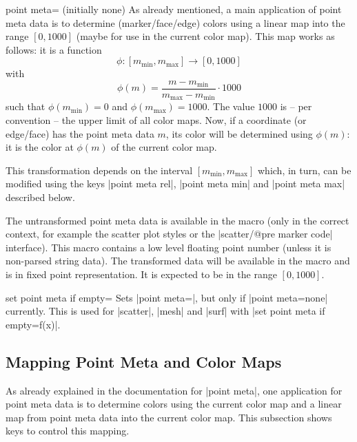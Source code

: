 \begin{pgfplotskey}{point meta= (initially none)%
}
    As already mentioned, a main application of point meta data is to determine
    (marker/face/edge) colors using a linear map into the range $[0,1000]$
    (maybe for use in the current color map). This map works as follows: it is
    a function
        \[ \phi\colon [m_{\min},m_{\max}] \to [0,1000] \]
    with
        \[ \phi(m) = \frac{m - m_{\min}}{m_{\max} - m_{\min}} \cdot 1000 \]
    such that $\phi(m_{\min}) = 0$ and $\phi(m_{\max})=1000$. The value $1000$
    is -- per convention -- the upper limit of all color maps. Now, if a
    coordinate (or edge/face) has the point meta data $m$, its color will be
    determined using $\phi(m)$: it is the color at $\phi(m)$\textperthousand{}
    of the current color map.

    This transformation depends on the interval $[m_{\min},m_{\max}]$ which, in
    turn, can be modified using the keys |point meta rel|, |point meta min| and
    |point meta max| described below.

    The untransformed point meta data is available in the macro
    \declareandlabel{\pgfplotspointmeta} (only in the correct context, for
    example the scatter plot styles or the |scatter/@pre marker code|
    interface). This macro contains a low level floating point number (unless
    it is non-parsed string data). The transformed data will be available in
    the macro \declareandlabel{\pgfplotspointmetatransformed} and is in fixed
    point representation. It is expected to be in the range $[0,1000]$.

\end{pgfplotskey}

\begin{pgfplotskey}{set point meta if empty=}
    Sets |point meta=|, but only if |point meta=none|
    currently. This is used for |scatter|, |mesh| and |surf| with
    |set point meta if empty=f(x)|.
\end{pgfplotskey}


\subsection{Mapping Point Meta and Color Maps}

As already explained in the documentation for |point meta|, one application for
point meta data is to determine colors using the current color map and a linear
map from point meta data into the current color map. This subsection shows keys
to control this mapping.

